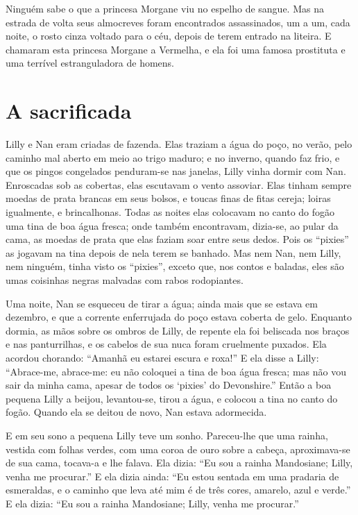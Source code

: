 Ninguém sabe o que a princesa Morgane viu no espelho de sangue. Mas na
estrada de volta seus almocreves foram encontrados assassinados, um a um,
cada noite, o rosto cinza voltado para o céu, depois de terem entrado na
liteira. E chamaram esta princesa Morgane a Vermelha, e ela foi uma famosa
prostituta e uma terrível estranguladora de homens.

\section{A sacrificada}

Lilly e Nan eram criadas de fazenda. Elas traziam a água do poço, no
verão, pelo caminho mal aberto em meio ao trigo maduro; e no inverno, quando faz
frio, e que os pingos congelados penduram-se nas janelas, Lilly vinha
dormir com Nan. Enroscadas sob as cobertas, elas escutavam o vento
assoviar. Elas tinham sempre moedas de prata brancas em seus bolsos, e toucas finas
de fitas cereja; loiras igualmente, e brincalhonas. Todas as noites elas
colocavam no canto do fogão uma tina de boa água fresca; onde também
encontravam, dizia-se, ao pular da cama, as moedas de prata que elas faziam soar
entre seus dedos. Pois os “pixies” as jogavam na tina depois de nela terem se
banhado. Mas nem Nan, nem Lilly, nem ninguém, tinha visto os “pixies”, exceto que,
nos contos e baladas, eles são umas coisinhas negras malvadas com rabos
rodopiantes.

Uma noite, Nan se esqueceu de tirar a água; ainda mais que se estava em
dezembro, e que a corrente enferrujada do poço estava coberta de gelo.
Enquanto dormia, as mãos sobre os ombros de Lilly, de repente ela foi
beliscada nos braços e nas panturrilhas, e os cabelos de sua nuca foram
cruelmente puxados. Ela acordou chorando: ``Amanhã eu estarei escura e
roxa!'' E ela disse a Lilly: “Abrace-me, abrace-me: eu não coloquei a tina
de boa água fresca; mas não vou sair da minha cama, apesar de todos os
`pixies' do Devonshire.” Então a boa pequena Lilly a beijou, levantou-se,
tirou a água, e colocou a tina no canto do fogão. Quando ela se deitou de
novo, Nan estava adormecida.


E em seu sono a pequena Lilly teve um sonho. Pareceu-lhe que uma
rainha, vestida com folhas verdes, com uma coroa de ouro sobre a cabeça,
aproximava-se de sua cama, tocava-a e lhe falava. Ela dizia: “Eu sou a
rainha Mandosiane; Lilly, venha me procurar.” E ela dizia ainda: “Eu estou
sentada em uma pradaria de esmeraldas, e o caminho que leva até mim é de
três cores, amarelo, azul e verde.” E ela dizia: “Eu sou a rainha
Mandosiane; Lilly, venha me procurar.”

